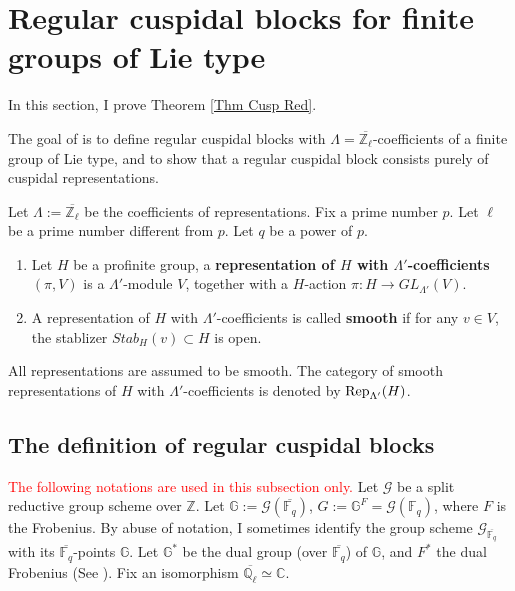 	
	
	
	\section{Regular cuspidal blocks for finite groups of Lie type}\label{Sec Reg Cusp}
	
	In this section, I prove Theorem \ref{Thm Cusp Red}.
	
	The goal of is to define regular cuspidal blocks with $\Lambda=\overline{\mathbb{Z}_{\ell}}$-coefficients of a finite group of Lie type, and to show that a regular cuspidal block consists purely of cuspidal representations.
	
	Let $\Lambda:=\overline{\mathbb{Z}_{\ell}}$ be the coefficients of representations. Fix a prime number $p$. Let $\ell$ be a prime number different from $p$. Let $q$ be a power of $p$.
	
	\begin{definition}
		\begin{enumerate}Let $\Lambda'$ be any ring.
			\item Let $H$ be a profinite group, a \textbf{representation of $H$ with $\Lambda'$-coefficients} $(\pi, V)$ is a $\Lambda'$-module $V$, together with a $H$-action $\pi: H \to GL_{\Lambda'}(V)$.
			\item A representation of $H$ with $\Lambda'$-coefficients is called \textbf{smooth} if for any $v \in V$, the stablizer $Stab_H(v) \subset H$ is open.
		\end{enumerate}
	\end{definition}
	
	All representations are assumed to be smooth. The category of smooth representations of $H$ with $\Lambda'$-coefficients is denoted by $\operatorname{\operatorname{Rep}}_{\Lambda'}(H)$.
	
	\subsection{The definition of regular cuspidal blocks}
	
	\textcolor{red}{The following notations are used in this subsection only.} Let $\mathcal{G}$ be a split reductive group scheme over $\mathbb{Z}$. Let $\mathbb{G}:=\mathcal{G}(\overline{\mathbb{F}_q})$, $G:=\mathbb{G}^F=\mathcal{G}(\mathbb{F}_q)$, where $F$ is the Frobenius. By abuse of notation, I sometimes identify the group scheme $\mathcal{G}_{\overline{\mathbb{F}_q}}$ with its $\overline{\mathbb{F}_q}$-points $\mathbb{G}$. Let $\mathbb{G}^*$ be the dual group (over $\overline{\mathbb{F}_q}$) of $\mathbb{G}$, and $F^*$ the dual Frobenius (See \cite[Section 4.2]{carter1985finite}). Fix an isomorphism $\overline{\mathbb{Q}_{\ell}} \simeq \mathbb{C}$. 
	

